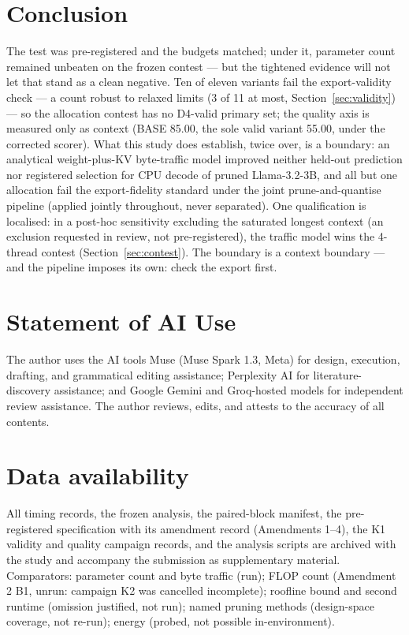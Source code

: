 \documentclass[10pt,letterpaper,twocolumn]{article}
\begin{document}
\section{Conclusion}
The test was pre-registered and the budgets matched; under it,
parameter count remained unbeaten on the frozen contest --- but the
tightened evidence will not let that stand as a clean negative.
Ten of eleven variants fail the export-validity check --- a count robust to relaxed limits (3 of 11 at most, Section~\ref{sec:validity}) --- so the allocation contest has no D4-valid primary set; the quality axis is measured only as context (BASE 85.00, the sole valid variant 55.00, under the corrected scorer). What this study does
establish, twice over, is a boundary: an analytical weight-plus-KV
byte-traffic model improved neither held-out prediction nor
registered selection for CPU decode of pruned Llama-3.2-3B, and
all but one allocation fail the export-fidelity standard under
the joint prune-and-quantise pipeline (applied jointly
throughout, never separated). One qualification is localised: in a post-hoc sensitivity
excluding the saturated longest context (an exclusion requested
in review, not pre-registered), the traffic model wins the
4-thread contest (Section~\ref{sec:contest}). The boundary is a context boundary --- and the pipeline imposes its own: check the export first.

\section*{Statement of AI Use}
The author uses the AI tools Muse (Muse Spark 1.3, Meta) for
design, execution, drafting, and grammatical editing assistance;
Perplexity AI for literature-discovery assistance; and Google
Gemini and Groq-hosted models for independent review assistance.
The author reviews, edits, and attests to the accuracy of all
contents.

\section*{Data availability}
All timing records, the frozen analysis, the paired-block manifest,
the pre-registered specification with its amendment record
(Amendments 1--4), the K1 validity and quality campaign records,
and the analysis scripts are archived with the study and accompany
the submission as supplementary material. Comparators: parameter count and byte
traffic (run); FLOP count (Amendment 2 B1, unrun: campaign K2
was cancelled incomplete); roofline bound and second runtime (omission justified, not run);
named pruning methods (design-space coverage, not re-run);
energy (probed, not possible in-environment).
\end{document}
